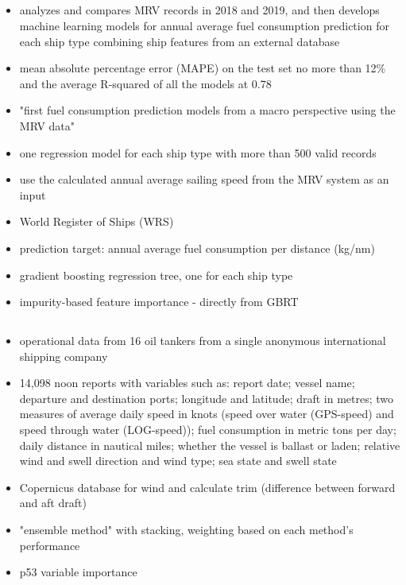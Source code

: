 \documentclass{article}
\newcommand{\paperpath}{../resources/}
\newcommand{\myhref}[2]{\href{run:\paperpath#1}{#2}}
\begin{document}
\subsection{\myhref{Yan et al 2023 - Analysis and prediction of ship energy efficiency based on the MRV system.pdf}{\textcite{yan2023analysis}}}
\begin{itemize}
    \item analyzes and compares MRV records in 2018 and 2019, and then develops machine learning models for annual average fuel con­sumption prediction for each ship type combining ship features from an external database
    \item mean absolute percentage error (MAPE) on the test set no more than 12\% and the average R-squared of all the models at 0.78
    \item "first fuel consumption prediction models from a macro perspective using the MRV data"
    \item one regression model for each ship type with more than 500 valid records
    \item use the calculated annual average sailing speed from the MRV system as an input
    \item World Register of Ships (WRS)
    \item prediction target: annual average fuel consumption per distance (kg/nm)
    \item gradient boosting regression tree, one for each ship type
    \item impurity-based feature importance - directly from GBRT

\end{itemize}
\subsection{\myhref{Jebsen et al 2020 - Estimating vessel environmental performance.pdf}{\textcite{jebsen2020estimating}}}
\begin{itemize}
    \item operational data from 16 oil tankers from a single anonymous international shipping company
    \item 14,098 noon reports with variables such as: report date; vessel name; departure and destination ports; longitude and
    latitude; draft in metres; two measures of average daily speed in knots (speed over water (GPS-speed) and speed through water (LOG-speed)); fuel consumption in metric tons per day; daily distance in nautical miles; whether the vessel is ballast or laden; relative wind and swell direction and wind type; sea state and swell state
    \item Copernicus database for wind and calculate trim (difference between forward and aft draft)
    \item "ensemble method" with stacking, weighting based on each method's performance
    \item p53 variable importance
\end{itemize}
\end{document}
